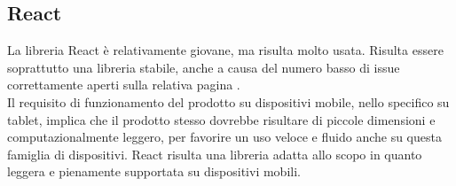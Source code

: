 \subsection{React}

La libreria React è relativamente giovane, ma risulta molto usata. Risulta essere soprattutto una libreria stabile, anche a causa del numero basso di issue correttamente aperti sulla relativa pagina .
\\Il requisito di funzionamento del prodotto su dispositivi mobile, nello specifico su tablet, implica che il prodotto stesso dovrebbe risultare di piccole dimensioni e computazionalmente leggero, per favorire un uso veloce e fluido anche su questa famiglia di dispositivi. React risulta una libreria adatta allo scopo in quanto leggera e pienamente supportata su dispositivi mobili. 